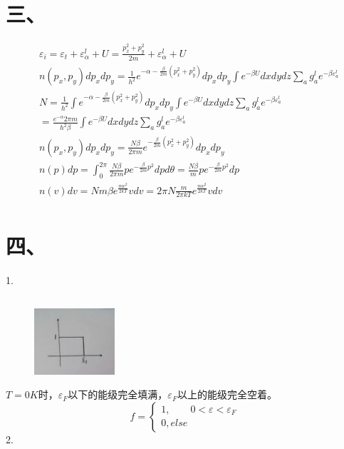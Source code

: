 \documentclass[UTF8]{ctexart}
\begin{document}
\section*{三、}
\begin{equation*}
  \begin{aligned}
     & \varepsilon_i=\varepsilon_t+\varepsilon_\alpha^l+U
    =\frac{p_x^2+p_y^2}{2m}+\varepsilon_\alpha^l+U                                        \\
     & n(p_x,p_y)dp_xdp_y=\frac{1}{h^2}e^{-\alpha-\frac{\beta}{2m}(p_x^2+p_y^2)}dp_xdp_y
    \int e^{-\beta U}dxdydz\sum\limits_ag_a^le^{-\beta\varepsilon_a^l}                    \\
     & N=\frac{1}{h^2}\int e^{-\alpha-\frac{\beta}{2m}(p_x^2+p_y^2)}dp_xdp_y
    \int e^{-\beta U}dxdydz\sum\limits_ag_a^le^{-\beta\varepsilon_a^l}                    \\
     & =\frac{e^{-\alpha}2\pi m}{h^2\beta}
    \int e^{-\beta U}dxdydz\sum\limits_ag_a^le^{-\beta\varepsilon_a^l}                    \\
     & n(p_x,p_y)dp_xdp_y=\frac{N\beta}{2\pi m}e^{-\frac{\beta}{2m}(p_x^2+p_y^2)}dp_xdp_y \\
     & n(p)dp=\int_0^{2\pi}\frac{N\beta}{2\pi m}pe^{-\frac{\beta}{2m}p^2}dpd\theta
    =\frac{N\beta}{m}pe^{-\frac{\beta}{2m}p^2}dp                                          \\
     & n(v)dv=Nm\beta e^{\frac{mv^2}{2kT}}vdv
    =2\pi N\frac{m}{2\pi kT}e^{\frac{mv^2}{2kT}}vdv                                       \\
  \end{aligned}
\end{equation*}
\section*{四、}
1.
\subsection*{}
\begin{figure}
  \includegraphics[width=3cm]{4_1.jpg}
\end{figure}
$T=0K$时，$\varepsilon_F$以下的能级完全填满，$\varepsilon_F$以上的能级完全空着。
\begin{equation*}
  f=\begin{cases}
    1,\quad\quad 0<\varepsilon<\varepsilon_F \\
    0, else
  \end{cases}
\end{equation*}
2.
\end{document}
